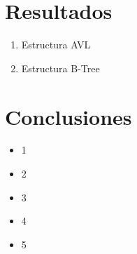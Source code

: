 \documentclass{article}
\begin{document}
\section{Resultados}


    \begin{enumerate}
    
        \item Estructura AVL
        \item Estructura B-Tree
        
    \end{enumerate}

\section{Conclusiones}

\begin{itemize}
            \item 1
\end{itemize}
\begin{itemize}
            \item 2
\end{itemize}

\begin{itemize}
            \item 3
\end{itemize}    
\begin{itemize}
            \item 4
\end{itemize}
\begin{itemize}
            \item 5
\end{itemize}	
		
	
\end{document}
